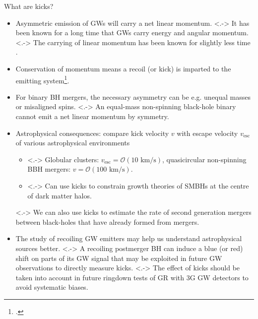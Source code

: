 \documentclass[smaller,aspectratio=169]{beamer}
\begin{document}
\begin{frame}{What are kicks?}
    \begin{itemize}
        \item<+-> 
            \alert{Asymmetric} emission of GWs will carry a net linear 
            momentum.
        \note[item]<.->{
            It has been known for a long time that GWs carry energy and
            angular momentum.}
        \note[item]<.->{
            The carrying of linear momentum has been known for slightly
            less time .}
        \item<+->
            Conservation of momentum means a recoil (or \alert{kick}) 
            is imparted to the emitting 
            system\footcite{Bonnor1961-wy,Peres:1962zz,Bekenstein:1973zz}.
        \item<+->
            For binary BH mergers, the necessary \alert{asymmetry} can be 
            e.g. unequal masses or misaligned spins.
        \note[item]<.->{
            An equal-mass non-spinning black-hole binary cannot emit a
            net linear momentum by symmetry.}
        \item<+->
            Astrophysical consequences: compare kick velocity $v$ with escape 
            velocity $v_{\text{esc}}$ of various astrophysical environments
            \begin{itemize}
                \item<.->
                    Globular clusters: 
                    $v_{\text{esc}}=\mathcal{O}(10\text{ km/s})$,
                    quasicircular non-spinning BBH mergers: 
                    $v = \mathcal{O}(100\text{ km/s})$.
                \item<.->
                    Can use kicks to constrain growth theories of 
                    SMBHs at the centre of dark matter halos.
            \end{itemize}
        \note[item]<.->{
            We can also use kicks to estimate the rate of second
            generation mergers between black-holes that have already
            formed from mergers.}
        \item<+->
            The study of recoiling GW emitters may help us understand
            astrophysical sources better.
        \note[item]<.->{
            A recoiling postmerger BH can induce
            a blue (or red) shift on parts of its GW signal that
            may be exploited in future GW observations to directly
            measure kicks.}
        \note[item]<.->{
            The effect of kicks should be taken into account in future
            ringdown tests of GR with 3G GW detectors to avoid systematic
            biases.}
    \end{itemize}
\end{frame}
\end{document}
